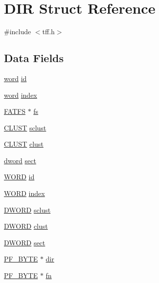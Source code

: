 \hypertarget{struct_d_i_r}{\section{D\-I\-R Struct Reference}
\label{struct_d_i_r}
}


{\ttfamily \#include $<$tff.\-h$>$}

\subsection*{Data Fields}
\begin{DoxyCompactItemize}
\item 
\hyperlink{p8_2pinguino_2core_2typedef_8h_abad51e07ab6d26bec9f1f786c8d65bcd}{word} \hyperlink{struct_d_i_r_a588688f55d57bf8a7e8c1d2cf88a3c56}{id}
\item 
\hyperlink{p8_2pinguino_2core_2typedef_8h_abad51e07ab6d26bec9f1f786c8d65bcd}{word} \hyperlink{struct_d_i_r_a7cb92c69ac44a71424d6b8a0c3dac288}{index}
\item 
\hyperlink{struct_f_a_t_f_s}{F\-A\-T\-F\-S} $\ast$ \hyperlink{struct_d_i_r_a472e3612956e3ffb3ab823c37ca33250}{fs}
\item 
\hyperlink{tff_8h_af322b62389c843d5727de4796a09f59c}{C\-L\-U\-S\-T} \hyperlink{struct_d_i_r_aada1acd6ce100ead798e712b18c49547}{sclust}
\item 
\hyperlink{tff_8h_af322b62389c843d5727de4796a09f59c}{C\-L\-U\-S\-T} \hyperlink{struct_d_i_r_aad779eab97ffc889755c8b483fbf9eb5}{clust}
\item 
\hyperlink{p8_2pinguino_2core_2typedef_8h_a74cb93d430006e784da73b8ca406ee6e}{dword} \hyperlink{struct_d_i_r_aa7c560f325cb4d59f40dc8cf731b6e22}{sect}
\item 
\hyperlink{p8_2pinguino_2libraries_2integer_8h_a197942eefa7db30960ae396d68339b97}{W\-O\-R\-D} \hyperlink{struct_d_i_r_a7b7a6396b2c82ad46c6d8b2bf141a8dd}{id}
\item 
\hyperlink{p8_2pinguino_2libraries_2integer_8h_a197942eefa7db30960ae396d68339b97}{W\-O\-R\-D} \hyperlink{struct_d_i_r_ab7c5089b70ce76bcd61abe615ed2a42b}{index}
\item 
\hyperlink{p8_2pinguino_2libraries_2integer_8h_ad342ac907eb044443153a22f964bf0af}{D\-W\-O\-R\-D} \hyperlink{struct_d_i_r_ad5d52f3fde971d2a05ff777a6243c252}{sclust}
\item 
\hyperlink{p8_2pinguino_2libraries_2integer_8h_ad342ac907eb044443153a22f964bf0af}{D\-W\-O\-R\-D} \hyperlink{struct_d_i_r_ac134c1b4645be670eb5207032e714616}{clust}
\item 
\hyperlink{p8_2pinguino_2libraries_2integer_8h_ad342ac907eb044443153a22f964bf0af}{D\-W\-O\-R\-D} \hyperlink{struct_d_i_r_a3e49e0860170e0fd9fc3e891b0d59975}{sect}
\item 
\hyperlink{p32_2include_2pinguino_2libraries_2sd_2integer_8h_aa1e36ce100a7ff1291e95b4515d42e65}{P\-F\-\_\-\-B\-Y\-T\-E} $\ast$ \hyperlink{struct_d_i_r_ab9e26ba9262ce0f12d043d71dd4b2cf5}{dir}
\item 
\hyperlink{p32_2include_2pinguino_2libraries_2sd_2integer_8h_aa1e36ce100a7ff1291e95b4515d42e65}{P\-F\-\_\-\-B\-Y\-T\-E} $\ast$ \hyperlink{struct_d_i_r_af5245f40680a50c52ce1028bbe62d9f9}{fn}
\end{DoxyCompactItemize}


